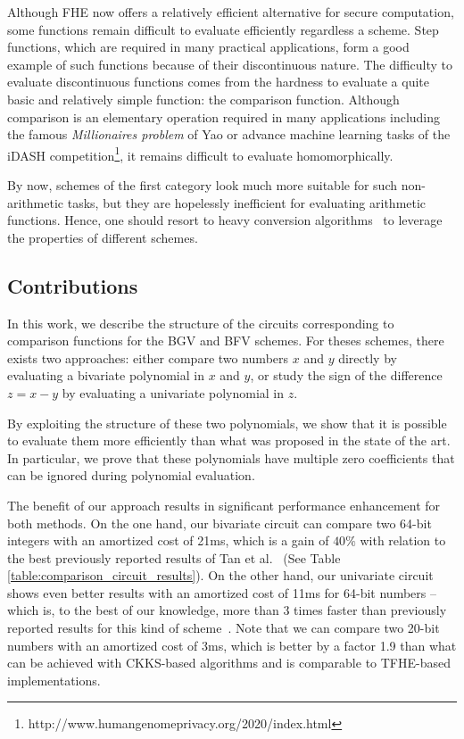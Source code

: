 Although \ac{FHE} now offers a relatively efficient alternative for secure computation, some functions remain difficult to evaluate efficiently regardless a scheme. 
Step functions, which are required in many practical applications, form a good example of such functions because of their discontinuous nature. 
The difficulty to evaluate discontinuous functions comes from the hardness to evaluate a quite basic and relatively simple function: the comparison function. 
Although comparison is an elementary operation required in many applications including the famous \emph{Millionaires problem} of Yao \cite{Yao82} or advance machine learning tasks of the iDASH competition\footnote{http://www.humangenomeprivacy.org/2020/index.html}, it remains difficult to evaluate homomorphically.

By now, schemes of the first category look much more suitable for such non-arithmetic tasks, but they are hopelessly inefficient for evaluating arithmetic functions.
Hence, one should resort to heavy conversion algorithms~\cite{JMC:BGGJ20} to leverage the properties of different schemes. 

\subsection{Contributions}
In this work, we describe the structure of the circuits corresponding to comparison functions for the BGV and BFV schemes. 
For theses schemes, there exists two approaches: either compare two numbers $x$ and $y$ directly by evaluating a bivariate polynomial in $x$ and $y$, or study the sign of the difference $z=x-y$ by evaluating a univariate polynomial in $z$.

By exploiting the structure of these two polynomials, we show that it is possible to evaluate them more efficiently than what was proposed in the state of the art.
In particular, we prove that these polynomials have multiple zero coefficients that can be ignored during polynomial evaluation.

The benefit of our approach results in significant performance enhancement for both methods. 
On the one hand, our bivariate circuit can compare two 64-bit integers with an amortized cost of 21ms, which is a gain of $40\%$ with relation to the best previously reported results of Tan et al.~\cite{TLWRK20} (See Table \ref{table:comparison_circuit_results}). 
On the other hand, our univariate circuit shows even better results with an amortized cost of 11ms for 64-bit numbers -- which is, to the best of our knowledge, more than 3 times faster than previously reported results for this kind of scheme~\cite{TLWRK20}. 
Note that we can compare two 20-bit numbers with an amortized cost of 3ms, which is better by a factor 1.9 than what can be achieved with CKKS-based algorithms and is comparable to TFHE-based implementations.


